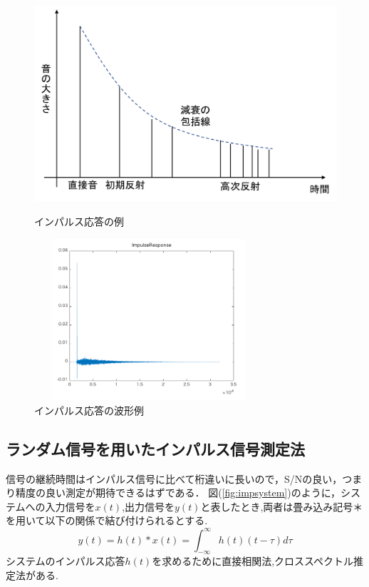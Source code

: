 \documentclass[a4j,11pt]{jsarticle}
\begin{document}
\begin{figure}[h]
\begin{center}
 \includegraphics[clip,width=140mm,height=80mm]{ImpulseResponse.pdf}
\end{center}
 \caption{インパルス応答の例\cite{oka3}}
 \label{fig:impulse}
\end{figure}

\begin{figure}[h]
\begin{center}
 \includegraphics[clip,width=85mm,height=60mm]{imprps.pdf}
\end{center}
 \caption{インパルス応答の波形例}
 \label{fig:impulse1}
\end{figure}
\newpage
\subsection{ランダム信号を用いたインパルス信号測定法}
信号の継続時間はインパルス信号に比べて桁違いに長いので，S/Nの良い，つまり精度の良い測定が期待できるはずである．
図(\ref{fig:impsystem})のように，システムへの入力信号を$x(t)$,出力信号を$y(t)$と表したとき,両者は畳み込み記号＊を用いて以下の関係で結び付けられるとする.
{\Large
\begin{equation}
\label{impulse}
  y(t) = h(t)*x(t)=\int^{\infty}_{-\infty} h(t)(t - \tau){d\tau}
\end{equation}
}
システムのインパルス応答$h(t)$を求めるために直接相関法,クロススペクトル推定法がある.
\end{document}
